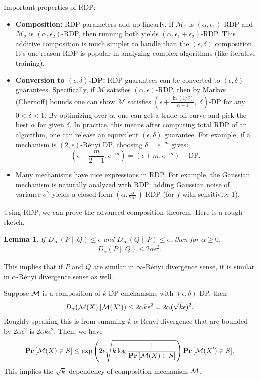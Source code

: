 \documentclass[11pt, a4paper]{article}
\newtheorem{lemma}{Lemma}
\begin{document}
Important properties of RDP:
\begin{itemize}
    \item \textbf{Composition:} RDP parameters add up linearly. If $\mathcal{M}_1$ is $(\alpha,\epsilon_1)$-RDP and $\mathcal{M}_2$ is $(\alpha,\epsilon_2)$-RDP, then running both yields $(\alpha,\epsilon_1+\epsilon_2)$-RDP. This additive composition is much simpler to handle than the $(\epsilon,\delta)$ composition. It's one reason RDP is popular in analyzing complex algorithms (like iterative training).
    \item \textbf{Conversion to $(\epsilon,\delta)$-DP:} RDP guarantees can be converted to $(\epsilon,\delta)$ guarantees. Specifically, if $\mathcal{M}$ satisfies $(\alpha,\epsilon)$-RDP, then by Markov (Chernoff) bounds one can show $\mathcal{M}$ satisfies $(\epsilon + \frac{\ln(1/\delta)}{\alpha-1},\; \delta)$-DP for any $0<\delta<1$. By optimizing over $\alpha$, one can get a trade-off curve and pick the best $\alpha$ for given $\delta$. In practice, this means after computing total RDP of an algorithm, one can release an equivalent $(\epsilon,\delta)$ guarantee.
        For example, if a mechanism is $(2, \epsilon)$-Rényi DP, choosing $\delta = e^{-m}$ gives:
        \[
        (\epsilon + \frac{m}{2-1}, e^{-m}) = (\epsilon+m, e^{-m})-\text{DP}.
        \]
    \item Many mechanisms have nice expressions in RDP. For example, the Gaussian mechanism is naturally analyzed with RDP:
    adding Gaussian noise of variance $\sigma^2$ yields a closed-form $(\alpha, \frac{\alpha}{2\sigma^2})$-RDP 
    (for $f$ with sensitivity 1).
\end{itemize}

Using RDP, we can prove the advanced composition theorem.
Here is a rough sketch.
\begin{lemma}
    If $D_{\infty}(P\|Q)\leq \epsilon$ and $D_{\infty}(Q\|P)\leq \epsilon$,
    then for $\alpha\geq 0$,
    \begin{align}
        D_\alpha (P\|Q) \leq 2\alpha \epsilon^2.
    \end{align}
\end{lemma}
This implies that if $P$ and $Q$ are similar in $\infty$-Rényi divergence sense,
it is similar in $\alpha$-Rényi divergence sense as well.

Suppose ${\cal M}$ is a composition of $k$ DP emchanisms with $(\epsilon, \delta)$-DP, then
\begin{align}
    D_{\alpha}({\cal M}(X)\| {\cal M}(X'))\leq 2\alpha k\epsilon^2 = 2\alpha (\sqrt{k}\epsilon)^2.
\end{align}
Roughly speaking this is from summing $k$ $\alpha$ Renyi-divergence that are bounded by $2\alpha\epsilon^2$ is $2\alpha k\epsilon^2$.
Then, we have
\begin{align}
    \Prob{\cM(X)\in S}\leq \exp\left(2\epsilon \sqrt{k\log\frac{1}{\Prob{\cM(X)\in S}}} \right) \Prob{\cM(X')\in S}.
\end{align}
This implies the $\sqrt{k}$ dependency of composition mechanism ${\cal M}$.
\end{document}
